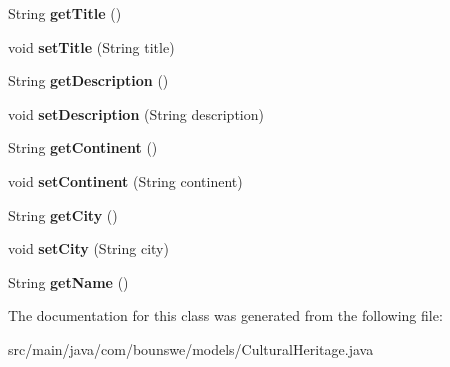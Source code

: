 \begin{DoxyCompactItemize}
String {\bfseries get\+Title} ()
\item 
\mbox{\label{classcom_1_1bounswe_1_1models_1_1_cultural_heritage_a4ab4f6c7001c4912994fa343722ce9ab}} 
void {\bfseries set\+Title} (String title)
\item 
\mbox{\label{classcom_1_1bounswe_1_1models_1_1_cultural_heritage_a0d121b90d558414fd0eb5ae870e57d44}} 
String {\bfseries get\+Description} ()
\item 
\mbox{\label{classcom_1_1bounswe_1_1models_1_1_cultural_heritage_af2128b15877d98b496c90468e920c2d8}} 
void {\bfseries set\+Description} (String description)
\item 
\mbox{\label{classcom_1_1bounswe_1_1models_1_1_cultural_heritage_a61821e00112824ad4a73aeabcbe8d48e}} 
String {\bfseries get\+Continent} ()
\item 
\mbox{\label{classcom_1_1bounswe_1_1models_1_1_cultural_heritage_a301c7e637549a5c7077aff048424ebbb}} 
void {\bfseries set\+Continent} (String continent)
\item 
\mbox{\label{classcom_1_1bounswe_1_1models_1_1_cultural_heritage_a6c78d2c5791fefbb9ef6691c827febdb}} 
String {\bfseries get\+City} ()
\item 
\mbox{\label{classcom_1_1bounswe_1_1models_1_1_cultural_heritage_ab8f2a5d33b86e937491b708c0a67afe8}} 
void {\bfseries set\+City} (String city)
\item 
\mbox{\label{classcom_1_1bounswe_1_1models_1_1_cultural_heritage_a12c26e2859be1d46b5c00bf36231b4be}} 
String {\bfseries get\+Name} ()
\end{DoxyCompactItemize}


The documentation for this class was generated from the following file\+:\begin{DoxyCompactItemize}
\item 
src/main/java/com/bounswe/models/Cultural\+Heritage.\+java\end{DoxyCompactItemize}
